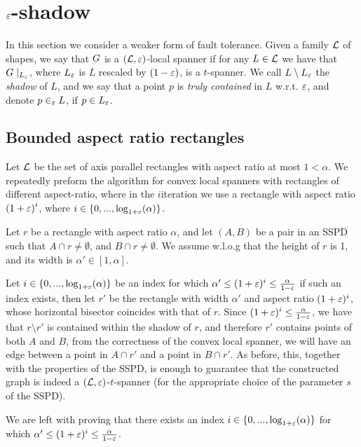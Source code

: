 \documentclass[12pt]{article}%
\begin{document}
\section{$\varepsilon$-shadow}

In this section we consider a weaker form of fault tolerance. Given a
family $\mathcal{L}$ of shapes, we say that $G$ is a $(\mathcal{L},\varepsilon)$-local
spanner if for any $L\in\mathcal{L}$ we have that $G\mid_{L_{\varepsilon}}$, where
$L_{\varepsilon}$ is $L$ rescaled by $(1-\varepsilon)$, is a $t$-spanner. We call
$L\setminus L_{\varepsilon}$ the \emph{shadow} of $L$, and we say that a
point $p$ is \emph{truly contained} in $L$ w.r.t. $\varepsilon$, and denote
$p\in_{\varepsilon} L$, if $p\in L_{\varepsilon}$.

\subsection{Bounded aspect ratio rectangles}
Let $\mathcal{L}$ be the set of axis parallel rectangles with aspect ratio at
most $1<\alpha$. We repeatedly preform the algorithm for convex local
spanners with rectangles of different aspect-ratio, where in the
$i$\th iteration we use a rectangle with aspect ratio
$\left(1+\varepsilon\right)^i$, where $i\in\{0,...,\log_{1+\varepsilon}(\alpha)\}$.

Let $r$ be a rectangle with aspect ratio $\alpha$, and let $(A,B)$ be
a pair in an SSPD such that $A\cap r\neq \emptyset$, and
$B\cap r\neq \emptyset$. We assume w.l.o.g that the height of $r$ is
1, and its width is $\alpha'\in [1,\alpha]$.

Let $i\in \{0,...,\log_{1+\varepsilon}(\alpha)\}$ be an index for which
$\alpha' \leq (1+\varepsilon)^i \leq \frac{\alpha}{1-\varepsilon}$ if such an index
exists, then let $r'$ be the rectangle with width $\alpha'$ and aspect
ratio $(1+\varepsilon)^i$, whose horizontal bisector coincides with that of
$r$. Since $(1+\varepsilon)^i \leq \frac{\alpha}{1-\varepsilon}$, we have that
$r\setminus r'$ is contained within the shadow of $r$, and therefore
$r'$ contains points of both $A$ and $B$, from the correctness of the
convex local spanner, we will have an edge between a point in
$A\cap r'$ and a point in $B\cap r'$. As before, this, together with
the properties of the SSPD, is enough to guarantee that the
constructed graph is indeed a $(\mathcal{L}, \varepsilon)$-$t$-spanner (for the
appropriate choice of the parameter $s$ of the SSPD).

We are left with proving that there exists an index
$i\in \{0,...,\log_{1+\varepsilon}(\alpha)\}$ for which
$\alpha' \leq (1+\varepsilon)^i \leq \frac{\alpha}{1-\varepsilon}$.
\end{document}
